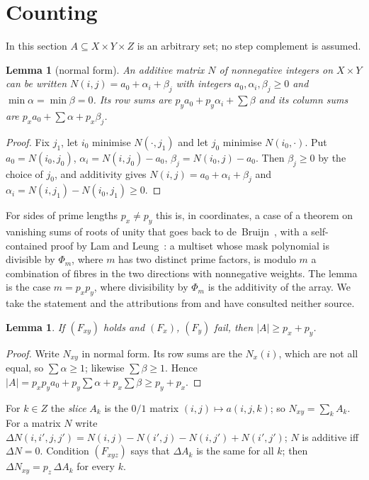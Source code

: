 \documentclass[11pt,a4paper]{amsart}
\newtheorem{lemma}[theorem]{Lemma}
\theoremstyle{definition}
\theoremstyle{remark}
\begin{document}
\section{Counting}\label{sec:count}

In this section $A\subseteq X\times Y\times Z$ is an arbitrary set; no step complement is assumed.

\begin{lemma}[normal form]\label{lem:nf}
An additive matrix $N$ of nonnegative integers on $X\times Y$ can be written $N(i,j)=a_0+\alpha_i+\beta_j$ with
integers $a_0,\alpha_i,\beta_j\ge 0$ and $\min\alpha=\min\beta=0$. Its row sums are
$p_ya_0+p_y\alpha_i+\sum\beta$ and its column sums are $p_xa_0+\sum\alpha+p_x\beta_j$.
\end{lemma}
\begin{proof}
Fix $j_1$, let $i_0$ minimise $N(\cdot,j_1)$ and let $j_0$ minimise $N(i_0,\cdot)$. Put $a_0=N(i_0,j_0)$,
$\alpha_i=N(i,j_0)-a_0$, $\beta_j=N(i_0,j)-a_0$. Then $\beta_j\ge 0$ by the choice of $j_0$, and additivity gives
$N(i,j)=a_0+\alpha_i+\beta_j$ and $\alpha_i=N(i,j_1)-N(i_0,j_1)\ge 0$.
\end{proof}

\noindent For sides of prime lengths $p_x\ne p_y$ this is, in coordinates, a case of a theorem on vanishing sums
of roots of unity that goes back to de~Bruijn~\cite{Bru}, with a self-contained proof by Lam and
Leung~\cite[Theorem~3.3]{LL}: a multiset whose mask polynomial is divisible by $\Phi_m$, where $m$ has two
distinct prime factors, is modulo $m$ a combination of fibres in the two directions with nonnegative weights.
The lemma is the case $m=p_xp_y$, where divisibility by $\Phi_m$ is the additivity of the array. We take the
statement and the attributions from \cite[Lemma~2.3]{KLaMS} and have consulted neither source.

\begin{lemma}\label{lem:three}
If $(F_{xy})$ holds and $(F_x)$, $(F_y)$ fail, then $|A|\ge p_x+p_y$.
\end{lemma}
\begin{proof}
Write $N_{xy}$ in normal form. Its row sums are the $N_x(i)$, which are not all equal, so $\sum\alpha\ge 1$;
likewise $\sum\beta\ge1$. Hence $|A|=p_xp_ya_0+p_y\sum\alpha+p_x\sum\beta\ge p_y+p_x$.
\end{proof}

For $k\in Z$ the \emph{slice} $A_k$ is the $0/1$ matrix $(i,j)\mapsto a(i,j,k)$; so $N_{xy}=\sum_kA_k$. For a
matrix $N$ write $\Delta N(i,i',j,j')=N(i,j)-N(i',j)-N(i,j')+N(i',j')$; $N$ is additive iff $\Delta N=0$.
Condition $(F_{xyz})$ says that $\Delta A_k$ is the same for all $k$; then $\Delta N_{xy}=p_z\,\Delta A_k$ for
every $k$.
\end{document}
